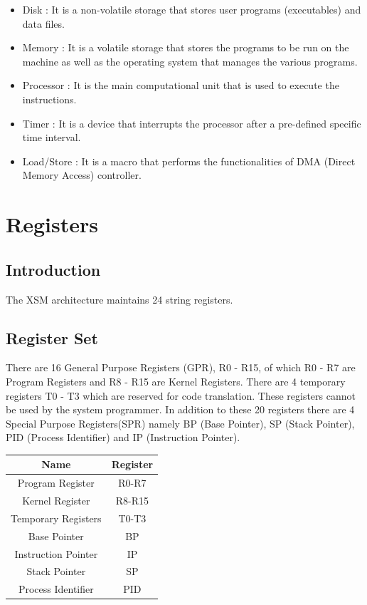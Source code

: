 \documentclass[11pt]{article}
\begin{document}
\begin{itemize}
\item Disk : It is a non-volatile storage that stores user programs (executables) and data files.
\item Memory : It is a volatile storage that stores the programs to be run on the machine as well as the operating system that manages the various programs.
\item Processor : It is the main computational unit that is used to execute the instructions.
\item Timer : It is a device that interrupts the processor after a pre-defined specific time interval.
\item Load/Store : It is a macro that performs the functionalities of DMA (Direct Memory Access) controller.
\end{itemize}






\section{Registers}

\subsection{Introduction}
The XSM architecture maintains 24 string registers.

\subsection{Register Set}
There are 16 General Purpose Registers (GPR), R0 - R15, of which R0 - R7 are Program Registers and R8 - R15 are Kernel Registers. There are 4 temporary registers T0 - T3 which are reserved for code translation. These registers cannot be used by the system programmer. In addition to these 20 registers there are 4 Special Purpose Registers(SPR) namely BP (Base Pointer), SP (Stack Pointer), PID (Process Identifier) and IP (Instruction Pointer).\\


\begin{center}
\begin{tabular}{|c|c|}
\hline Name & Register \\ 
\hline Program Register & R0-R7 \\ 
\hline Kernel Register & R8-R15 \\ 
\hline Temporary Registers & T0-T3 \\ 
\hline Base Pointer & BP \\ 
\hline Instruction Pointer & IP \\ 
\hline Stack Pointer & SP \\ 
\hline Process Identifier & PID \\ 
\hline 
\end{tabular} 
\end{center}
\end{document}
